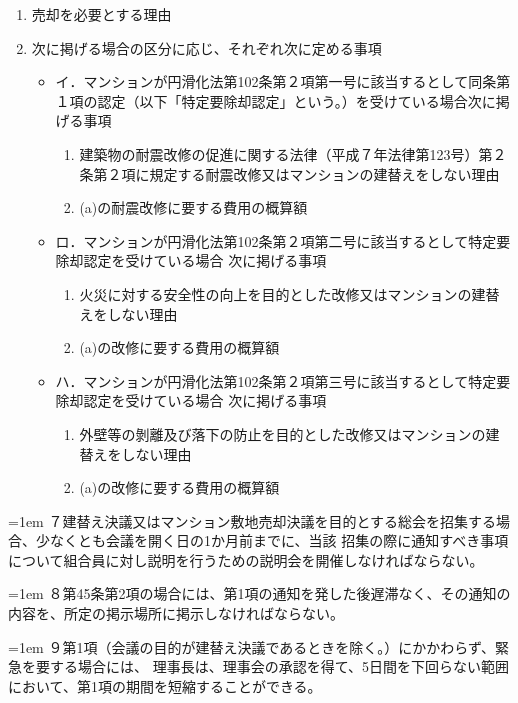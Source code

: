 \documentclass[
  twoside,
  luatex,
  paper=a4paper,
  fontsize=11pt,
  jafontsize=11pt,
  jlreq_notes,
]{jlreq}
\newcommand{\kou}[2]{%
  \par\noindent\hangindent=1em\hangafter=1
  #1\hspace{1em}#2%
}
\begin{document}
  \begin{enumerate}
    \item 売却を必要とする理由
    \item 次に掲げる場合の区分に応じ、それぞれ次に定める事項
      \begin{itemize}[label={}, leftmargin=2em, itemindent=-2em]
        \item イ．マンションが円滑化法第102条第２項第一号に該当するとして同条第１項の認定（以下「特定要除却認定」という。）を受けている場合次に掲げる事項
          \begin{enumerate}
            \item 建築物の耐震改修の促進に関する法律（平成７年法律第123号）第２条第２項に規定する耐震改修又はマンションの建替えをしない理由
            \item (a)の耐震改修に要する費用の概算額
          \end{enumerate}
        \item ロ．マンションが円滑化法第102条第２項第二号に該当するとして特定要除却認定を受けている場合 次に掲げる事項
          \begin{enumerate}
            \item 火災に対する安全性の向上を目的とした改修又はマンションの建替えをしない理由
            \item (a)の改修に要する費用の概算額
          \end{enumerate}
        \item ハ．マンションが円滑化法第102条第２項第三号に該当するとして特定要除却認定を受けている場合 次に掲げる事項
          \begin{enumerate}
            \item 外壁等の剝離及び落下の防止を目的とした改修又はマンションの建替えをしない理由
            \item (a)の改修に要する費用の概算額
          \end{enumerate}
      \end{itemize}
  \end{enumerate}
  \kou{７}{建替え決議又はマンション敷地売却決議を目的とする総会を招集する場合、少なくとも会議を開く日の1か月前までに、当該
  招集の際に通知すべき事項について組合員に対し説明を行うための説明会を開催しなければならない。}
  \kou{８}{第45条第2項の場合には、第1項の通知を発した後遅滞なく、その通知の内容を、所定の掲示場所に掲示しなければならない。}
  \kou{９}{第1項（会議の目的が建替え決議であるときを除く。）にかかわらず、緊急を要する場合には、
  理事長は、理事会の承認を得て、5日間を下回らない範囲において、第1項の期間を短縮することができる。}
\end{document}
